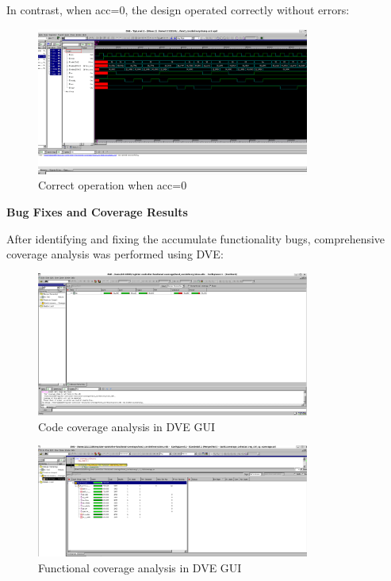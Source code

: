 \documentclass[11pt]{article}
\begin{document}
In contrast, when acc=0, the design operated correctly without errors:

\begin{figure}[h]
\centering
\includegraphics[width=0.8\textwidth]{acc_low_no_error.png}
\caption{Correct operation when acc=0}
\end{figure}

\textbf{Bug Fixes and Coverage Results}

After identifying and fixing the accumulate functionality bugs, comprehensive coverage analysis was performed using DVE:

\begin{figure}[h]
\centering
\includegraphics[width=0.8\textwidth]{code_coverage_dve_gui.png}
\caption{Code coverage analysis in DVE GUI}
\end{figure}

\begin{figure}[h]
\centering
\includegraphics[width=0.8\textwidth]{functional_cov_dve_gui.png}
\caption{Functional coverage analysis in DVE GUI}
\end{figure}
\end{document}
